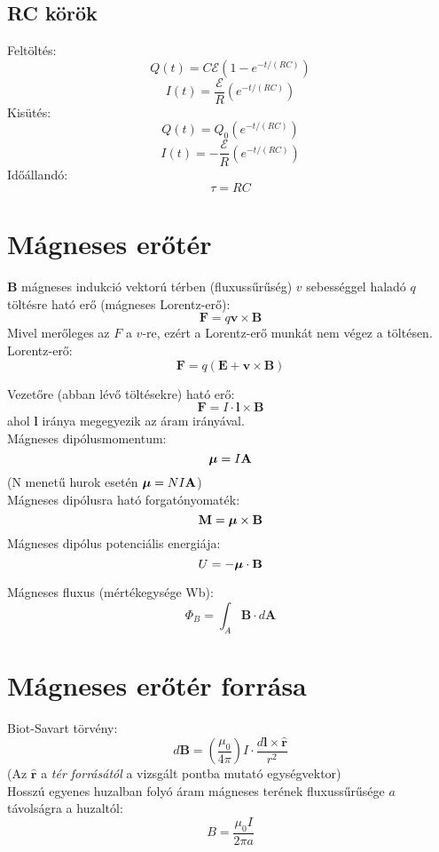 \documentclass[12pt,a4paper,twocolumn]{article}
\begin{document}
  \subsection{RC körök}
  
  Feltöltés:
  \[Q(t) = C\mathcal{E}(1-e^{-t/(RC)})\]
  \[I(t) = \frac{\mathcal{E}}{R}(e^{-t/(RC)})\]
  Kisütés:
  \[Q(t) = Q_0(e^{-t/(RC)})\]
  \[I(t) = -\frac{\mathcal{E}}{R}(e^{-t/(RC)})\]
  Időállandó:
  \[\tau = RC\]
  
  \section{Mágneses erőtér}
  
  $\mathbf{B}$ mágneses indukció vektorú térben (fluxussűrűség) $v$ sebességgel haladó $q$ töltésre ható erő (mágneses Lorentz-erő):
  \[\mathbf{F} = q \mathbf{v}\times \mathbf{B}\]
  Mivel merőleges az $F$ a $v$-re, ezért a Lorentz-erő munkát nem végez a töltésen.\\
  
  Lorentz-erő:
  \[\mathbf{F} = q(\mathbf{E} + \mathbf{v}\times\mathbf{B})\]
  
  Vezetőre (abban lévő töltésekre) ható erő:
  \[\mathbf{F} = I\cdot \mathbf{l}\times\mathbf{B}\]
  ahol $\mathbf{l}$ iránya megegyezik az áram irányával.\\
  
  Mágneses dipólusmomentum:
  \[\hbox{\boldmath$\mu$} = I\mathbf{A}\]
  (N menetű hurok esetén $\hbox{\boldmath$\mu$} = NI\mathbf{A}$)\\
  Mágneses dipólusra ható forgatónyomaték:
  \[\mathbf{M} = \hbox{\boldmath$\mu$} \times \mathbf{B}\]
  Mágneses dipólus potenciális energiája:
  \[U = -\hbox{\boldmath$\mu$} \cdot \mathbf{B}\]
  
  Mágneses fluxus (mértékegysége Wb):
  \[\Phi_{B} = \int_A \mathbf{B} \cdot d\mathbf{A}\]
  
  \section{Mágneses erőtér forrása}

  Biot-Savart törvény:
	\[d\mathbf{B} = \left(\frac{\mu_0}{4\pi}\right) I\cdot \frac{d\mathbf{l} \times \mathbf{\hat{r}}}{r^2}\]
  (Az $\mathbf{\hat{r}}$ a \textit{tér forrásától} a vizsgált pontba mutató egységvektor)\\

  Hosszú egyenes huzalban folyó áram mágneses terének fluxussűrűsége $a$ távolságra a huzaltól:
	\[B = \frac{\mu_0 I}{2\pi a}\]
\end{document}
